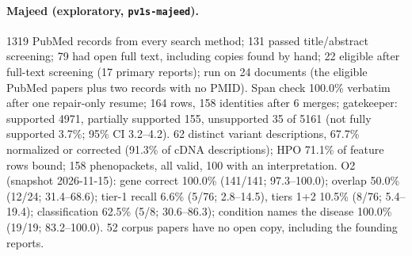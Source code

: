 \documentclass{article} %
\begin{document}
\paragraph{Majeed (exploratory, \texttt{pv1s-majeed}).} 1319 PubMed records from every search method; 131 passed title/abstract screening; 79 had open full text, including copies found by hand; 22 eligible after full-text screening (17 primary reports); run on 24 documents (the eligible PubMed papers plus two records with no PMID). Span check 100.0\% verbatim after one repair-only resume; 164 rows, 158 identities after 6 merges; gatekeeper: supported 4971, partially supported 155, unsupported 35 of 5161 (not fully supported 3.7\%; 95\% CI 3.2--4.2). 62 distinct variant descriptions, 67.7\% normalized or corrected (91.3\% of cDNA descriptions); HPO 71.1\% of feature rows bound; 158 phenopackets, all valid, 100 with an interpretation. O2 (snapshot 2026-11-15): gene correct 100.0\% (141/141; 97.3--100.0); overlap 50.0\% (12/24; 31.4--68.6); tier-1 recall 6.6\% (5/76; 2.8--14.5), tiers 1+2 10.5\% (8/76; 5.4--19.4); classification 62.5\% (5/8; 30.6--86.3); condition names the disease 100.0\% (19/19; 83.2--100.0). 52 corpus papers have no open copy, including the founding reports.
\end{document}
